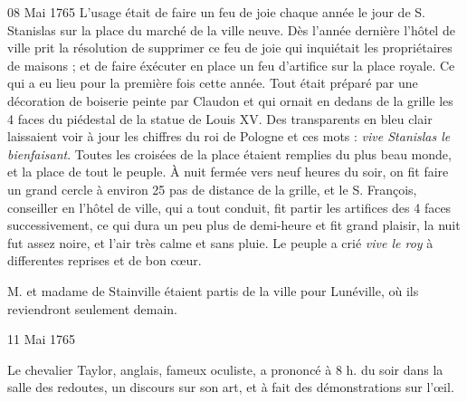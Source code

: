 \begin{diary}{08 Mai 1765}{}
                         L'usage était de faire un feu de joie chaque
                           année le jour de S. Stanislas sur la
                              place du
                              marché de la ville neuve. Dès l'année dernière
                           l'hôtel de ville prit la résolution
                           de supprimer
                           ce feu de joie qui inquiétait les propriétaires
                           de maisons ; et de faire éxécuter en place
                           un feu d'artifice sur la place royale.
                           Ce qui a eu lieu pour la première fois cette
                           année. Tout était préparé par une
                           décoration de boiserie peinte par Claudon
                           et qui ornait en dedans de la grille les
                           4 faces du piédestal de la statue de Louis XV.
                           Des transparents en bleu clair laissaient
                           voir à jour les chiffres du roi
                              de Pologne
                           et ces mots : \emph{vive Stanislas le
                              bienfaisant}.
                           Toutes les croisées de la place étaient
                           remplies du plus beau monde, et la place
                           de tout le peuple. À nuit fermée vers
                           neuf heures du soir, on fit faire un grand
                           cercle à environ 25 pas de distance de la grille, et le S. François, conseiller en l'hôtel
                              de ville, qui a tout conduit, fit partir les
                           artifices des 4 faces successivement, ce qui
                           dura un peu plus de demi-heure et fit grand plaisir, la nuit fut assez noire,
                           et l'air très calme et sans
                           pluie. Le
                           peuple a crié \emph{vive le roy} à
                           differentes
                           reprises et de bon cœur. \bigskip



                           M. et madame de Stainville étaient partis
                           de la ville pour Lunéville,
                           où ils
                           reviendront seulement demain. \bigskip


                     \end{diary}
                     \begin{diary}{11 Mai 1765}{}


                           Le chevalier Taylor, anglais, fameux
                           oculiste,
                           a prononcé à 8 h. du soir dans la salle des
                           redoutes, un discours sur son art, et à fait
                           des démonstrations sur l'œil. \bigskip


                     \end{diary}
